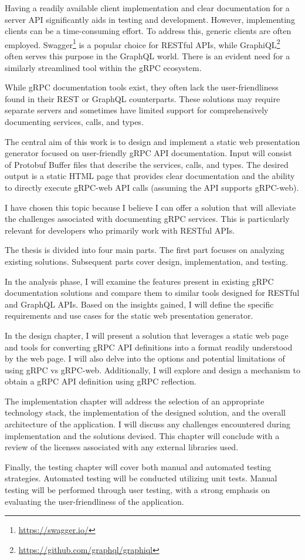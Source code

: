 Having a readily available client implementation and clear documentation for a server API significantly aids in testing and development.
However, implementing clients can be a time-consuming effort.
To address this, generic clients are often employed.
Swagger\footnote{\url{https://swagger.io/}} is a popular choice for RESTful APIs, while GraphiQL\footnote{\url{https://github.com/graphql/graphiql}} often serves this purpose in the GraphQL world.
There is an evident need for a similarly streamlined tool within the gRPC ecosystem.

While gRPC documentation tools exist, they often lack the user-friendliness found in their REST or GraphQL counterparts.
These solutions may require separate servers and sometimes have limited support for comprehensively documenting services, calls, and types.

The central aim of this work is to design and implement a static web presentation generator focused on user-friendly gRPC API documentation.
Input will consist of Protobuf Buffer files that describe the services, calls, and types.
The desired output is a static HTML page that provides clear documentation and the ability to directly execute gRPC-web API calls (assuming the API supports gRPC-web).

I have chosen this topic because I believe I can offer a solution that will alleviate the challenges associated with documenting gRPC services.
This is particularly relevant for developers who primarily work with RESTful APIs.

The thesis is divided into four main parts.
The first part focuses on analyzing existing solutions.
Subsequent parts cover design, implementation, and testing.

In the analysis phase, I will examine the features present in existing gRPC documentation solutions and compare them to similar tools designed for RESTful and GraphQL APIs.
Based on the insights gained, I will define the specific requirements and use cases for the static web presentation generator.

In the design chapter, I will present a solution that leverages a static web page and tools for converting gRPC API definitions into a format readily understood by the web page.
I will also delve into the options and potential limitations of using gRPC vs gRPC-web.
Additionally, I will explore and design a mechanism to obtain a gRPC API definition using gRPC reflection.

The implementation chapter will address the selection of an appropriate technology stack, the implementation of the designed solution, and the overall architecture of the application.
I will discuss any challenges encountered during implementation and the solutions devised.
This chapter will conclude with a review of the licenses associated with any external libraries used.

Finally, the testing chapter will cover both manual and automated testing strategies.
Automated testing will be conducted utilizing unit tests.
Manual testing will be performed through user testing, with a strong emphasis on evaluating the user-friendliness of the application.